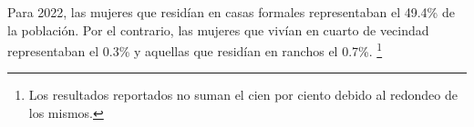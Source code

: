 Para 2022, las mujeres que residían en casas formales representaban el 49.4\% de la población. Por el contrario, las mujeres que vivían en cuarto de vecindad representaban el 0.3\% y aquellas que residían en ranchos el 0.7\%. \footnote{Los resultados reportados no suman el cien por ciento debido al redondeo de los mismos.}